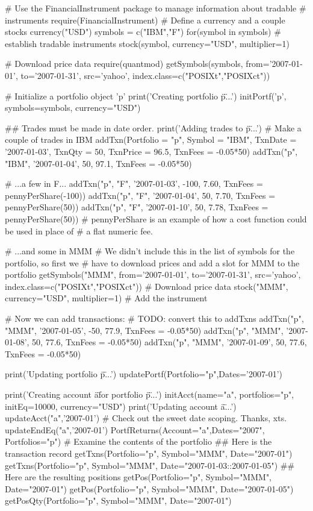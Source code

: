 # Use the FinancialInstrument package to manage information about tradable
# instruments
require(FinancialInstrument)
# Define a currency and a couple stocks
currency("USD")
symbols = c("IBM","F")
for(symbol in symbols){ # establish tradable instruments
    stock(symbol, currency="USD", multiplier=1)
}

# Download price data
require(quantmod)
getSymbols(symbols, from='2007-01-01', to='2007-01-31', src='yahoo',
index.class=c("POSIXt","POSIXct"))

# Initialize a portfolio object 'p'
print('Creating portfolio \"p\"...')
initPortf('p', symbols=symbols, currency="USD")

## Trades must be made in date order.
print('Adding trades to \"p\"...')
# Make a couple of trades in IBM
addTxn(Portfolio = "p", Symbol = "IBM", TxnDate = '2007-01-03', TxnQty = 50,
TxnPrice = 96.5, TxnFees = -0.05*50)
addTxn("p", "IBM", '2007-01-04', 50, 97.1, TxnFees = -0.05*50)

# ...a few in F...
addTxn("p", "F", '2007-01-03', -100, 7.60, TxnFees = pennyPerShare(-100))
addTxn("p", "F", '2007-01-04', 50, 7.70, TxnFees = pennyPerShare(50))
addTxn("p", "F", '2007-01-10', 50, 7.78, TxnFees = pennyPerShare(50))
# pennyPerShare is an example of how a cost function could be used in place of
# a flat numeric fee.

# ...and some in MMM
# We didn't include this in the list of symbols for the portfolio, so first we
# have to download prices and add a slot for MMM to the portfolio
getSymbols("MMM", from='2007-01-01', to='2007-01-31', src='yahoo',
index.class=c("POSIXt","POSIXct")) # Download price data
stock("MMM", currency="USD", multiplier=1) # Add the instrument

# Now we can add transactions:
# TODO: convert this to addTxns
addTxn("p", "MMM", '2007-01-05', -50, 77.9, TxnFees = -0.05*50)
addTxn("p", "MMM", '2007-01-08', 50, 77.6, TxnFees = -0.05*50)
addTxn("p", "MMM", '2007-01-09', 50, 77.6, TxnFees = -0.05*50)

print('Updating portfolio \"p\"...')
updatePortf(Portfolio="p",Dates='2007-01')

print('Creating account \"a\" for portfolio \"p\"...')
initAcct(name="a", portfolios="p", initEq=10000, currency="USD")
print('Updating account \"a\"...')
updateAcct("a",'2007-01') # Check out the sweet date scoping. Thanks, xts.
updateEndEq("a",'2007-01')
PortfReturns(Account="a",Dates="2007", Portfolios="p")
# Examine the contents of the portfolio
## Here is the transaction record
getTxns(Portfolio="p", Symbol="MMM", Date="2007-01")
getTxns(Portfolio="p", Symbol="MMM", Date="2007-01-03::2007-01-05")
## Here are the resulting positions
getPos(Portfolio="p", Symbol="MMM", Date="2007-01")
getPos(Portfolio="p", Symbol="MMM", Date="2007-01-05")
getPosQty(Portfolio="p", Symbol="MMM", Date="2007-01")

